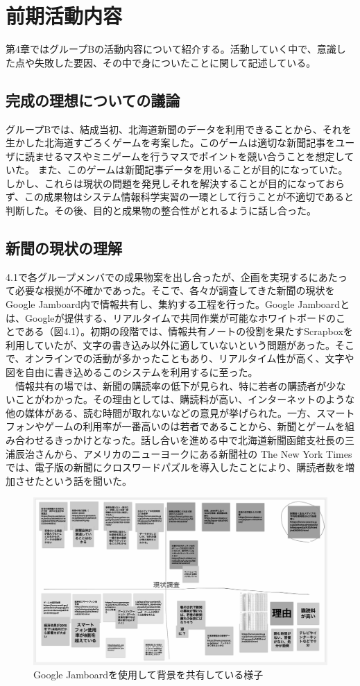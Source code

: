 \chapter{前期活動内容}
第4章ではグループBの活動内容について紹介する。活動していく中で、意識した点や失敗した要因、その中で身についたことに関して記述している。
\section{完成の理想についての議論}
グループBでは、結成当初、北海道新聞のデータを利用できることから、それを生かした北海道すごろくゲームを考案した。このゲームは適切な新聞記事をユーザに読ませるマスやミニゲームを行うマスでポイントを競い合うことを想定していた。
また、このゲームは新聞記事データを用いることが目的になっていた。しかし、これらは現状の問題を発見しそれを解決することが目的になっておらず、この成果物はシステム情報科学実習の一環として行うことが不適切であると判断した。その後、目的と成果物の整合性がとれるように話し合った。
\section{新聞の現状の理解}
4.1で各グループメンバでの成果物案を出し合ったが、企画を実現するにあたって必要な根拠が不確かであった。そこで、各々が調査してきた新聞の現状をGoogle Jamboard内で情報共有し、集約する工程を行った。Google Jamboardとは、Googleが提供する、リアルタイムで共同作業が可能なホワイトボードのことである（図4.1）。初期の段階では、情報共有ノートの役割を果たすScrapboxを利用していたが、文字の書き込み以外に適していないという問題があった。そこで、オンラインでの活動が多かったこともあり、リアルタイム性が高く、文字や図を自由に書き込めるこのシステムを利用するに至った。\\
　情報共有の場では、新聞の購読率の低下が見られ、特に若者の購読者が少ないことがわかった。その理由としては、購読料が高い、インターネットのような他の媒体がある、読む時間が取れないなどの意見が挙げられた。一方、スマートフォンやゲームの利用率が一番高いのは若者であることから、新聞とゲームを組み合わせるきっかけとなった。話し合いを進める中で北海道新聞函館支社長の三浦辰治さんから、アメリカのニューヨークにある新聞社の The New York Times では、電子版の新聞にクロスワードパズルを導入したことにより、購読者数を増加させたという話を聞いた。
\newpage
\begin{figure}[htbp]
    \centering
    \includegraphics[width=12cm]{images/Project_Research.png}
    \caption{Google Jamboardを使用して背景を共有している様子}
    \label{fig:my_label}
\end{figure}

